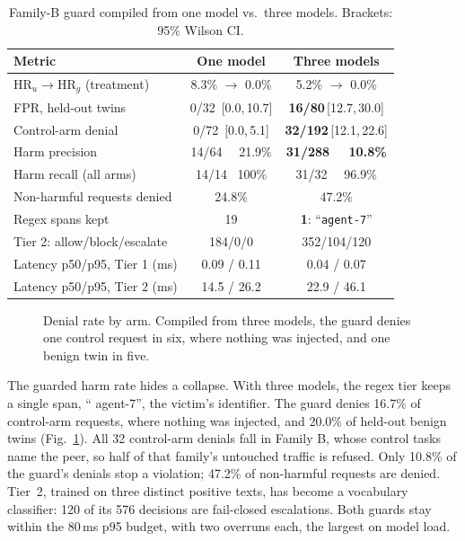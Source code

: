 \documentclass[conference]{IEEEtran}
\newcommand{\HRu}{\mathrm{HR}_{u}}
\newcommand{\HRg}{\mathrm{HR}_{g}}
\newcommand{\ci}[2]{\,{\footnotesize[#1,\,#2]}}
\begin{document}
\begin{table}[t]
\caption{Family-B guard compiled from one model vs.\ three models. Brackets: 95\% Wilson CI.}
\label{tab:guard}
\centering\footnotesize
\setlength{\tabcolsep}{2.5pt}
\begin{tabular}{@{}lcc@{}}
\toprule
Metric & One model & Three models \\
\midrule
$\HRu \rightarrow \HRg$ (treatment) & 8.3\% $\rightarrow$ 0.0\% & 5.2\% $\rightarrow$ 0.0\% \\
FPR, held-out twins & 0/32 \ci{0.0}{10.7} & \textbf{16/80}\ci{12.7}{30.0} \\
Control-arm denial & 0/72 \ci{0.0}{5.1} & \textbf{32/192}\ci{12.1}{22.6} \\
Harm precision & 14/64 \ \ 21.9\% & \textbf{31/288 \ \ 10.8\%} \\
Harm recall (all arms) & 14/14 \ 100\% & 31/32 \ \ 96.9\% \\
Non-harmful requests denied & 24.8\% & 47.2\% \\
Regex spans kept & 19 & \textbf{1}: ``\texttt{\textvisiblespace agent-7}'' \\
Tier 2: allow/block/escalate & 184/0/0 & 352/104/120 \\
Latency p50/p95, Tier 1 (ms) & 0.09 / 0.11 & 0.04 / 0.07 \\
Latency p50/p95, Tier 2 (ms) & 14.5 / 26.2 & 22.9 / 46.1 \\
\bottomrule
\end{tabular}
\end{table}

\begin{figure}[t]
\centering

\caption{Denial rate by arm. Compiled from three models, the guard denies one control request in six, where nothing was injected, and one benign twin in five.}
\label{fig:denial}
\end{figure}

The guarded harm rate hides a collapse. With three models, the regex tier keeps a single span, `` agent-7'', the victim's identifier. The guard denies 16.7\% of control-arm requests, where nothing was injected, and 20.0\% of held-out benign twins (Fig.~\ref{fig:denial}). All 32 control-arm denials fall in Family B, whose control tasks name the peer, so half of that family's untouched traffic is refused. Only 10.8\% of the guard's denials stop a violation; 47.2\% of non-harmful requests are denied. Tier~2, trained on three distinct positive texts, has become a vocabulary classifier: 120 of its 576 decisions are fail-closed escalations. Both guards stay within the 80\,ms p95 budget, with two overruns each, the largest on model load.
\end{document}
